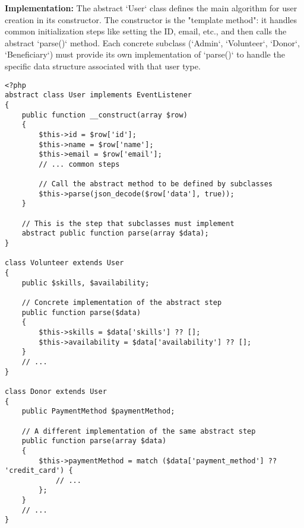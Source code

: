 \documentclass[11pt,a4paper]{article}
\begin{document}
\textbf{Implementation:} The abstract `User` class defines the main algorithm for user creation in its constructor. The constructor is the "template method": it handles common initialization steps like setting the ID, email, etc., and then calls the abstract `parse()` method. Each concrete subclass (`Admin`, `Volunteer`, `Donor`, `Beneficiary`) must provide its own implementation of `parse()` to handle the specific data structure associated with that user type.

\begin{lstlisting}[caption={The Template Method pattern in the User hierarchy.}, label={lst:template-method}]
% Filepath: src\models\users.php
<?php
abstract class User implements EventListener
{
	public function __construct(array $row)
	{
		$this->id = $row['id'];
		$this->name = $row['name'];
		$this->email = $row['email'];
		// ... common steps
		
		// Call the abstract method to be defined by subclasses
		$this->parse(json_decode($row['data'], true));
	}

	// This is the step that subclasses must implement
	abstract public function parse(array $data);
}

class Volunteer extends User
{
	public $skills, $availability;

	// Concrete implementation of the abstract step
	public function parse($data)
	{
		$this->skills = $data['skills'] ?? [];
		$this->availability = $data['availability'] ?? [];
	}
    // ...
}

class Donor extends User
{
	public PaymentMethod $paymentMethod;

	// A different implementation of the same abstract step
	public function parse(array $data)
	{
		$this->paymentMethod = match ($data['payment_method'] ?? 'credit_card') {
			// ...
		};
	}
    // ...
}
\end{lstlisting}
\end{document}
